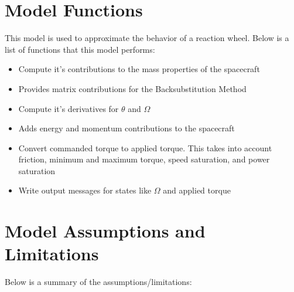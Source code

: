 \section{Model Functions}

This model is used to approximate the behavior of a reaction wheel. Below is a list of functions that this model performs:

\begin{itemize}
	\item Compute it's contributions to the mass properties of the spacecraft
	\item Provides matrix contributions for the Backsubstitution Method
	\item Compute it's derivatives for $\theta$ and $\Omega$
	\item Adds energy and momentum contributions to the spacecraft
	\item Convert commanded torque to applied torque. This takes into account friction, minimum and maximum torque, speed saturation, and power saturation
	\item Write output messages for states like $\Omega$ and applied torque
\end{itemize}

\section{Model Assumptions and Limitations}
Below is a summary of the assumptions/limitations:

